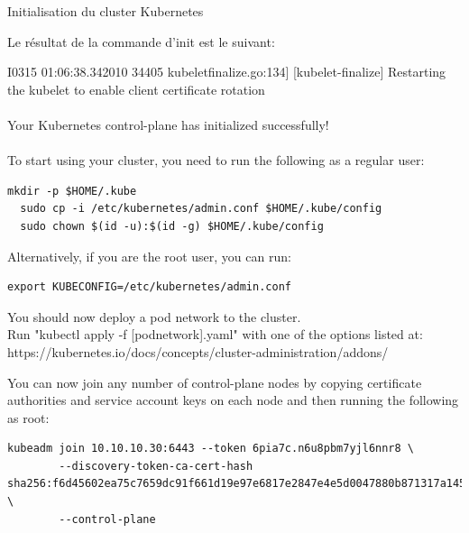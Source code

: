 \begin{frame}[shrink=7,fragile]{Initialisation du cluster Kubernetes}

Le résultat de la commande d'init est le suivant:

\begin{toile}

I0315 01:06:38.342010   34405 kubeletfinalize.go:134] [kubelet-finalize] Restarting the kubelet to enable client certificate rotation\\
\\
Your Kubernetes control-plane has initialized successfully!\\
\\
To start using your cluster, you need to run the following as a regular user:

\begin{tiny}
\begin{Verbatim}[commandchars=\&\@\@]
  mkdir -p $HOME/.kube
  sudo cp -i /etc/kubernetes/admin.conf $HOME/.kube/config
  sudo chown $(id -u):$(id -g) $HOME/.kube/config
\end{Verbatim}
\end{tiny}

Alternatively, if you are the root user, you can run:\\

\begin{tiny}
\begin{Verbatim}[commandchars=\&\@\@]
  export KUBECONFIG=/etc/kubernetes/admin.conf
\end{Verbatim}
\end{tiny}

You should now deploy a pod network to the cluster.\\
Run "kubectl apply -f [podnetwork].yaml" with one of the options listed at:\\
  https://kubernetes.io/docs/concepts/cluster-administration/addons/

You can now join any number of control-plane nodes by copying certificate authorities
and service account keys on each node and then running the following as root:

\begin{tiny}
\begin{Verbatim}[commandchars=\&\@\@]
  kubeadm join 10.10.10.30:6443 --token 6pia7c.n6u8pbm7yjl6nnr8 \
        --discovery-token-ca-cert-hash sha256:f6d45602ea75c7659dc91f661d19e97e6817e2847e4e5d0047880b871317a145 \
        --control-plane 
\end{Verbatim}
\end{tiny}


\end{toile}
\end{frame}

